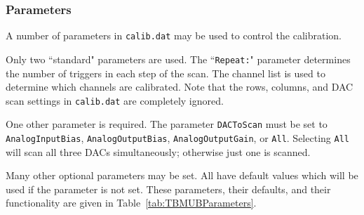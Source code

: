 \subsubsection{Parameters}
A number of parameters in \verb|calib.dat| may be used to control the calibration.

Only two ``standard" parameters are used.  The ``\verb|Repeat:|" parameter determines the number of triggers in each step of the scan.  The channel list is used to determine which channels are calibrated.  Note that the rows, columns, and DAC scan settings in \verb|calib.dat| are completely ignored.

One other parameter is required.  The parameter \verb|DACToScan| must be set to \verb|AnalogInputBias|, \verb|AnalogOutputBias|, \verb|AnalogOutputGain|, or \verb|All|.  Selecting \verb|All| will scan all three DACs simultaneously; otherwise just one is scanned.

Many other optional parameters may be set.  All have default values which will be used if the parameter is not set.  These parameters, their defaults, and their functionality are given in Table~\ref{tab:TBMUBParameters}.

